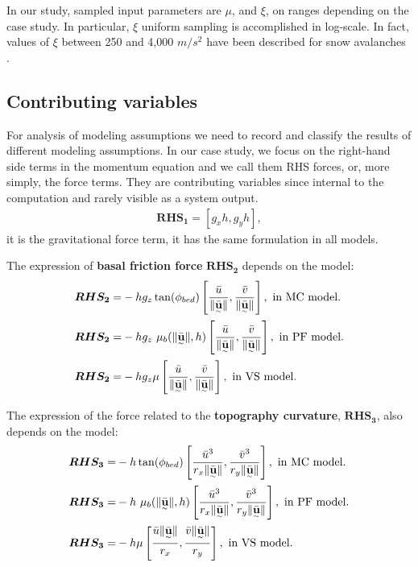 \documentclass{article}
\begin{document}
In our study, sampled input parameters are $\mu$, and $\xi$, on ranges depending on the case study. In particular, $\xi$ uniform sampling is accomplished in log-scale. In fact, values of $\xi$ between 250 and 4,000 $m/s^2$ have been described for snow avalanches \citep{Salm1993,Bartelt1999,Gruber2007}.

\subsection{Contributing variables}\label{sec:Fterms}
For analysis of modeling assumptions we need to record and classify the results of different modeling assumptions. In our case study, we focus on the right-hand side terms in the momentum equation and we call them RHS forces, or, more simply, the force terms. They are contributing variables since internal to the computation and rarely visible as a system output.
\begin{align}
\boldsymbol{RHS_1} = [g_x h,g_y h],
\end{align}
it is the gravitational force term, it has the same formulation in all models.

The expression of {\bf basal friction force} $\boldsymbol{RHS_2}$ depends on the model:
\begin{align}
\boldsymbol{RHS_2} =& -h g_z\tan(\phi_{bed})\left[\frac{\bar{u}}{\| \underset{^\sim}{\bar{\textbf u}} \|}, \frac{\bar{v}}{\| \underset{^\sim}{\bar{\textbf u}} \|} \right],\textmd{ in MC model.}\nonumber\\
\boldsymbol{RHS_2} =& - h g_z \ \mu_{b}(\|\underset{^\sim}{\bar{\textbf{u}}} \| , h)\left[\frac{\bar{u}}{\| \underset{^\sim}{\bar{\textbf{u}}} \|}, \frac{\bar{v}}{\| \underset{^\sim}{\bar{\textbf{u}}} \|}\right],\textmd{ in PF model.}\\
\boldsymbol{RHS_2} =& -h g_{z} \mu\left[\frac{\bar{u}}{\| \underset{^\sim}{\bar{\textbf u}}\|} , \frac{\bar{v}}{\| \underset{^\sim}{\bar{\textbf u}}\|}\right],\textmd{ in VS model.}\nonumber
\end{align}

The expression of the force related to the {\bf topography curvature}, $\boldsymbol{RHS_3}$, also depends on the model:
\begin{align}
\boldsymbol{RHS_3} =&-h \tan(\phi_{bed})\left[\frac{\bar{u}^3}{r_x\| \underset{^\sim}{\bar{\textbf{u}}} \|}, \frac{\bar{v}^3}{r_y\| \underset{^\sim}{\bar{\textbf{u}}} \|}\right],\textmd{ in MC model.}\nonumber\\
\boldsymbol{RHS_3} =& -h\ \mu_{b}(\|\underset{^\sim}{\bar{\textbf{u}}} \|,h)\left[\frac{\bar{u}^3}{r_x\| \underset{^\sim}{\bar{\textbf{u}}} \|}, \frac{\bar{v}^3}{r_y\| \underset{^\sim}{\bar{\textbf{u}}} \|}\right],\textmd{ in PF model.}\\
\boldsymbol{RHS_3} =& -h \mu\left[\frac{\bar{u}\| \underset{^\sim}{\bar{\textbf u}} \|}{r_{x}},\frac{\bar{v}\| \underset{^\sim}{\bar{\textbf u}} \|}{r_{y}}\right],\textmd{ in VS model.}\nonumber
\end{align}
\end{document}
